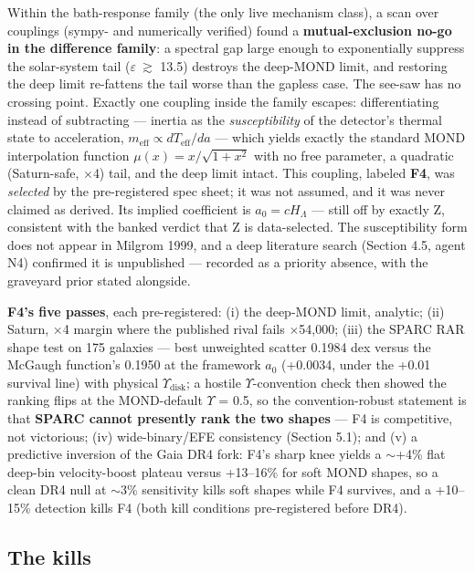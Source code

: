 \documentclass[11pt,a4paper]{article}
\begin{document}
Within the bath-response family (the only live mechanism class), a scan over couplings (sympy- and numerically verified) found a \textbf{mutual-exclusion no-go in the difference family}: a spectral gap large enough to exponentially suppress the solar-system tail ($\varepsilon\ \gtrsim$ 13.5) destroys the deep-MOND limit, and restoring the deep limit re-fattens the tail worse than the gapless case. The see-saw has no crossing point. Exactly one coupling inside the family escapes: differentiating instead of subtracting --- inertia as the \emph{susceptibility} of the detector's thermal state to acceleration, \textbf{$m_{\mathrm{eff}} \propto dT_{\mathrm{eff}}/da$} --- which yields exactly the standard MOND interpolation function $\mu(x) = x/\sqrt{1+x^2}$ with no free parameter, a quadratic (Saturn-safe, $\times$4) tail, and the deep limit intact. This coupling, labeled \textbf{F4}, was \emph{selected} by the pre-registered spec sheet; it was not assumed, and it was never claimed as derived. Its implied coefficient is $a_0 = cH_\Lambda$ --- still off by exactly Z, consistent with the banked verdict that Z is data-selected. The susceptibility form does not appear in Milgrom 1999, and a deep literature search (Section 4.5, agent N4) confirmed it is unpublished --- recorded as a priority absence, with the graveyard prior stated alongside.

\textbf{F4's five passes}, each pre-registered: (i) the deep-MOND limit, analytic; (ii) Saturn, $\times$4 margin where the published rival fails $\times$54,000; (iii) the SPARC RAR shape test on 175 galaxies --- best unweighted scatter 0.1984 dex versus the McGaugh function's 0.1950 at the framework $a_{0}$ (+0.0034, under the +0.01 survival line) with physical $\Upsilon_{\mathrm{disk}}$; a hostile $\Upsilon$-convention check then showed the ranking flips at the MOND-default $\Upsilon$ = 0.5, so the convention-robust statement is that \textbf{SPARC cannot presently rank the two shapes} --- F4 is competitive, not victorious; (iv) wide-binary/EFE consistency (Section 5.1); and (v) a predictive inversion of the Gaia DR4 fork: F4's sharp knee yields a $\sim$+4\% flat deep-bin velocity-boost plateau versus +13--16\% for soft MOND shapes, so a clean DR4 null at $\sim$3\% sensitivity kills soft shapes while F4 survives, and a +10--15\% detection kills F4 (both kill conditions pre-registered before DR4).

\subsection{The kills}
\end{document}
